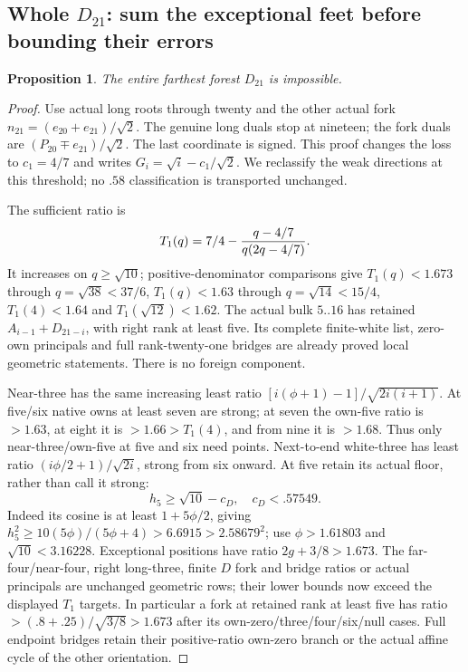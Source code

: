 \documentclass[11pt]{article}
\newtheorem{proposition}[theorem]{Proposition}
\theoremstyle{definition}
\theoremstyle{remark}
\begin{document}
\subsection{Whole $D_{21}$: sum the exceptional feet before bounding their errors}
\label{app:tail:wholeD21}
\begin{proposition}
\label{app:tail:prop:wholeD21}
The entire farthest forest $D_{21}$ is impossible.
\end{proposition}
\begin{proof}
Use actual long roots through twenty and the other actual fork
$n_{21}=(e_{20}+e_{21})/\sqrt2$. The genuine long duals stop at
nineteen; the fork duals are $(P_{20}\mathbin\mp e_{21})/\sqrt2$.
The last coordinate is signed. This proof changes the loss to
$c_1=4/7$ and writes $G_i=\sqrt i-c_1/\sqrt2$.
We reclassify the weak directions at this threshold; no $.58$
classification is transported unchanged.

The sufficient ratio is
\[
 T_1(q)=7/4-{q-4/7\over q(2q-4/7)}.
\]
It increases on $q\ge\sqrt{10}$; positive-denominator comparisons
give $T_1(q)<1.673$ through $q=\sqrt{38}<37/6$,
$T_1(q)<1.63$ through $q=\sqrt{14}<15/4$,
$T_1(4)<1.64$ and $T_1(\sqrt{12})<1.62$.
The actual bulk $5..16$ has retained $A_{i-1}+D_{21-i}$, with
right rank at least five. Its complete finite-white list, zero-own
principals and full rank-twenty-one bridges are already proved
local geometric statements. There is no foreign component.

Near-three has the same increasing least ratio
$[i(\phi+1)-1]/\sqrt{2i(i+1)}$. At five/six native owns at least
seven are strong; at seven the own-five ratio is $>1.63$, at
eight it is $>1.66>T_1(4)$, and from nine it is $>1.68$.
Thus only near-three/own-five at five and six need points.
Next-to-end white-three has least ratio $(i\phi/2+1)/\sqrt{2i}$,
strong from six onward. At five retain its actual floor, rather
than call it strong:
\[
 h_5\ge\sqrt{10}-c_D,\quad c_D<.57549.
\]
Indeed its cosine is at least $1+5\phi/2$, giving
$h_5^2\ge10(5\phi)/(5\phi+4)>6.6915>2.58679^2$;
use $\phi>1.61803$ and $\sqrt{10}<3.16228$.
Exceptional positions have ratio $2g+3/8>1.673$.
The far-four/near-four, right long-three, finite $D$ fork and
bridge ratios or actual principals are unchanged geometric rows;
their lower bounds now exceed the displayed $T_1$ targets. In
particular a fork at retained rank at least five has ratio
$>(.8+.25)/\sqrt{3/8}>1.673$ after its own-zero/three/four/six/null
cases. Full endpoint bridges retain their positive-ratio own-zero
branch or the actual affine cycle of the other orientation.


\end{proof}
\end{document}
